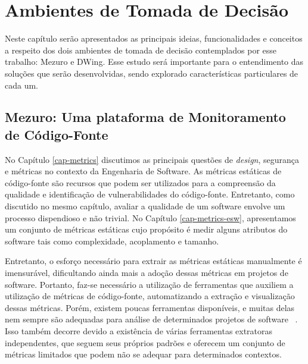 \chapter{Ambientes de Tomada de Decisão}
\label{cap-decision-making-environment}

%

Neste capítulo serão apresentados as principais ideias, funcionalidades e conceitos a respeito dos dois ambientes de tomada de decisão contemplados por esse trabalho: Mezuro e DWing. Esse estudo será importante para o entendimento das soluções que serão desenvolvidas, sendo explorado características particulares de cada um.

%

\section{Mezuro: Uma plataforma de Monitoramento de Código-Fonte}
\label{cap-mezuro}

No Capítulo \ref{cap-metrics} discutimos as principais questões de \emph{design}, segurança e métricas no contexto da Engenharia de Software. As métricas estáticas de código-fonte são recursos que podem ser utilizados para a compreensão da qualidade e identificação de vulnerabilidades do código-fonte. Entretanto, como discutido no mesmo capítulo, avaliar a qualidade de um software envolve um processo dispendioso e não trivial. No Capítulo \ref{cap-metrics-esw}, apresentamos um conjunto de métricas estáticas cujo propósito é medir alguns atributos do software tais como complexidade, acoplamento e tamanho. 

%

Entretanto, o esforço necessário para extrair as métricas estáticas manualmente é imensurável, dificultando ainda mais a adoção dessas métricas em projetos de software.
%
Portanto, faz-se necessário a utilização de ferramentas que auxiliem a utilização de métricas de código-fonte, automatizando a extração e visualização dessas métricas.
%
Porém, existem poucas ferramentas disponíveis, e muitas delas nem sempre são adequadas para análise de determinados projetos de software ~\cite{meirelles2010mezuro}.
%
Isso também decorre devido a existência de várias ferramentas extratoras independentes, que seguem seus próprios padrões e oferecem um conjunto de métricas limitados que podem não se adequar para determinados contextos.

%

